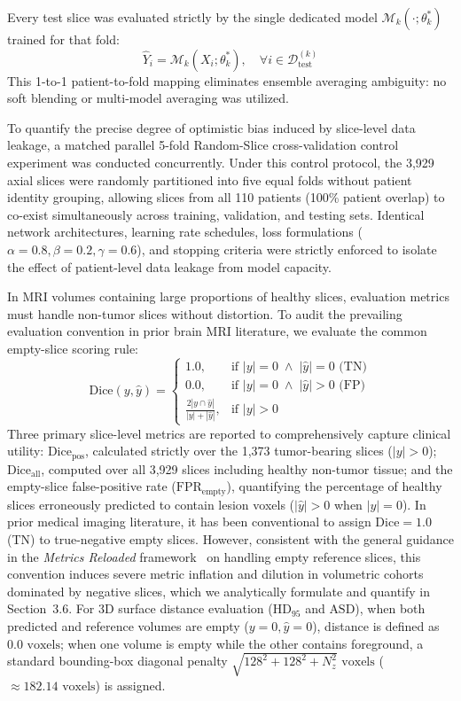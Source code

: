 \documentclass[11pt,a4paper]{article}
\begin{document}
Every test slice was evaluated strictly by the single dedicated model $\mathcal{M}_k(\cdot; \theta_k^*)$ trained for that fold:
\begin{equation}
\hat{Y}_i = \mathcal{M}_k(X_i; \theta_k^*), \quad \forall i \in \mathcal{D}_{\text{test}}^{(k)}
\end{equation}
This 1-to-1 patient-to-fold mapping eliminates ensemble averaging ambiguity: no soft blending or multi-model averaging was utilized.

To quantify the precise degree of optimistic bias induced by slice-level data leakage, a matched parallel 5-fold Random-Slice cross-validation control experiment was conducted concurrently. Under this control protocol, the 3,929 axial slices were randomly partitioned into five equal folds without patient identity grouping, allowing slices from all 110 patients (100\% patient overlap) to co-exist simultaneously across training, validation, and testing sets. Identical network architectures, learning rate schedules, loss formulations ($\alpha=0.8, \beta=0.2, \gamma=0.6$), and stopping criteria were strictly enforced to isolate the effect of patient-level data leakage from model capacity.

In MRI volumes containing large proportions of healthy slices, evaluation metrics must handle non-tumor slices without distortion. To audit the prevailing evaluation convention in prior brain MRI literature, we evaluate the common empty-slice scoring rule:
\begin{equation}
\text{Dice}(y, \hat{y}) = \begin{cases}
1.0, & \text{if } |y| = 0 \;\land\; |\hat{y}| = 0 \text{ (TN)} \\
0.0, & \text{if } |y| = 0 \;\land\; |\hat{y}| > 0 \text{ (FP)} \\
\frac{2|y \cap \hat{y}|}{|y| + |\hat{y}|}, & \text{if } |y| > 0
\end{cases}
\end{equation}
Three primary slice-level metrics are reported to comprehensively capture clinical utility: $\text{Dice}_{\text{pos}}$, calculated strictly over the 1,373 tumor-bearing slices ($|y| > 0$); $\text{Dice}_{\text{all}}$, computed over all 3,929 slices including healthy non-tumor tissue; and the empty-slice false-positive rate ($\text{FPR}_{\text{empty}}$), quantifying the percentage of healthy slices erroneously predicted to contain lesion voxels ($|\hat{y}| > 0$ when $|y| = 0$). In prior medical imaging literature, it has been conventional to assign $\text{Dice} = 1.0$ (TN) to true-negative empty slices. However, consistent with the general guidance in the \textit{Metrics Reloaded} framework~\cite{maierhein2024metrics} on handling empty reference slices, this convention induces severe metric inflation and dilution in volumetric cohorts dominated by negative slices, which we analytically formulate and quantify in Section~3.6. For 3D surface distance evaluation ($\text{HD}_{95}$ and $\text{ASD}$), when both predicted and reference volumes are empty ($y=0, \hat{y}=0$), distance is defined as $0.0\text{ voxels}$; when one volume is empty while the other contains foreground, a standard bounding-box diagonal penalty $\sqrt{128^2 + 128^2 + N_z^2}\text{ voxels}$ ($\approx 182.14\text{ voxels}$) is assigned.
\end{document}
